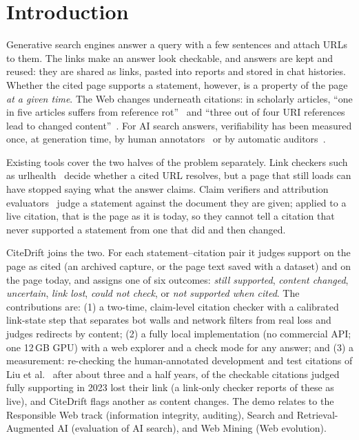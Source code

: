 \section{Introduction}
Generative search engines answer a query with a few sentences and attach URLs to them. The links make an answer look checkable, and answers are kept and reused: they are shared as links, pasted into reports and stored in chat histories. Whether the cited page supports a statement, however, is a property of the page \emph{at a given time}. The Web changes underneath citations: in scholarly articles, ``one in five articles suffers from reference rot''~\cite{Klein_2014} and ``three out of four URI references lead to changed content''~\cite{Jones_2016}. For AI search answers, verifiability has been measured once, at generation time, by human annotators~\cite{Liu_2023} or by automatic auditors~\cite{Wu_2025,venkit2025deeptraceauditingdeepresearch}.

Existing tools cover the two halves of the problem separately. Link checkers such as urlhealth~\cite{rao2026detectingcorrectingreferencehallucinations} decide whether a cited URL resolves, but a page that still loads can have stopped saying what the answer claims. Claim verifiers and attribution evaluators~\cite{Tang_2024,Gao_2023,Yue_2023} judge a statement against the document they are given; applied to a live citation, that is the page as it is today, so they cannot tell a citation that never supported a statement from one that did and then changed.

CiteDrift joins the two. For each statement--citation pair it judges support on the page as cited (an archived capture, or the page text saved with a dataset) and on the page today, and assigns one of six outcomes: \emph{still supported}, \emph{content changed}, \emph{uncertain}, \emph{link lost}, \emph{could not check}, or \emph{not supported when cited}. The contributions are:
(1) a two-time, claim-level citation checker with a calibrated link-state step that separates bot walls and network filters from real loss and judges redirects by content;
(2) a fully local implementation (no commercial API; one 12\,GB GPU) with a web explorer and a check mode for any answer; and
(3) a measurement: re-checking the human-annotated development and test citations of Liu et al.~\cite{Liu_2023} after about three and a half years, \linkLostRate of the checkable citations judged fully supporting in 2023 lost their link (a link-only checker reports \uhLiveLinkLostPct of these as live), and CiteDrift flags another \changedRate as content changes.
The demo relates to the Responsible Web track (information integrity, auditing), Search and Retrieval-Augmented AI (evaluation of AI search), and Web Mining (Web evolution).
